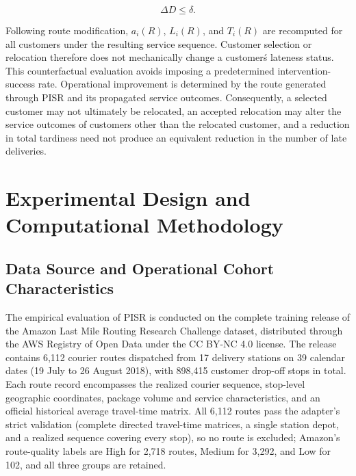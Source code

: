 \documentclass[11pt,a4paper]{article}
\begin{document}
\begin{equation}
\Delta D \leq \delta.
\label{eq:22}
\end{equation}

Following route modification, \(a_{i}(R)\), \(L_{i}(R)\), and
\(T_{i}(R)\) are recomputed for all customers under the resulting
service sequence. Customer selection or relocation therefore does not
mechanically change a customer\'s lateness status. This
counterfactual evaluation avoids imposing a predetermined
intervention-success rate. Operational improvement is determined by the
route generated through PISR and its propagated service outcomes.
Consequently, a selected customer may not ultimately be relocated, an
accepted relocation may alter the service outcomes of customers other
than the relocated customer, and a reduction in total tardiness need not
produce an equivalent reduction in the number of late deliveries.

\section{Experimental Design and Computational Methodology}\label{sec:experimental-design}

\subsection{Data Source and Operational Cohort Characteristics}\label{sec:data-cohort}
The empirical evaluation of PISR is conducted on the complete training release of the Amazon Last Mile Routing Research Challenge dataset, distributed through the AWS Registry of Open Data under the CC BY-NC 4.0 license. The release contains 6,112 courier routes dispatched from 17 delivery stations on 39 calendar dates (19 July to 26 August 2018), with 898,415 customer drop-off stops in total. Each route record encompasses the realized courier sequence, stop-level geographic coordinates, package volume and service characteristics, and an official historical average travel-time matrix. All 6,112 routes pass the adapter's strict validation (complete directed travel-time matrices, a single station depot, and a realized sequence covering every stop), so no route is excluded; Amazon's route-quality labels are High for 2,718 routes, Medium for 3,292, and Low for 102, and all three groups are retained.
\end{document}
